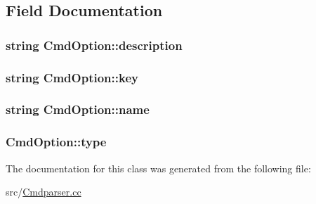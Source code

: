 \subsection{\-Field \-Documentation}
\hypertarget{classCmdOption_ac32fa75074204c87679faaf974bf5772}{
\subsubsection[{description}]{\setlength{\rightskip}{0pt plus 5cm}string {\bf \-Cmd\-Option\-::description}}}
\label{classCmdOption_ac32fa75074204c87679faaf974bf5772}
\hypertarget{classCmdOption_a35e6bd03bd85d22f6cec9320607a3f4f}{
\subsubsection[{key}]{\setlength{\rightskip}{0pt plus 5cm}string {\bf \-Cmd\-Option\-::key}}}
\label{classCmdOption_a35e6bd03bd85d22f6cec9320607a3f4f}
\hypertarget{classCmdOption_ab497267003660f7ded144742ca959b17}{
\subsubsection[{name}]{\setlength{\rightskip}{0pt plus 5cm}string {\bf \-Cmd\-Option\-::name}}}
\label{classCmdOption_ab497267003660f7ded144742ca959b17}
\hypertarget{classCmdOption_a4f7842ecea0fa864e6714109b30d94ff}{
\subsubsection[{type}]{ {\bf \-Cmd\-Option\-::type}}}
\label{classCmdOption_a4f7842ecea0fa864e6714109b30d94ff}


\-The documentation for this class was generated from the following file\-:\begin{DoxyCompactItemize}
\item 
src/\hyperlink{Cmdparser_8cc}{\-Cmdparser.\-cc}\end{DoxyCompactItemize}
